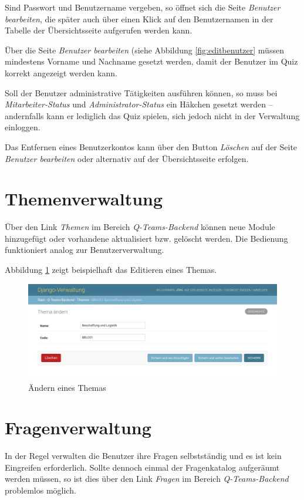 \documentclass[a4paper,11pt,listof=numbered,glossary=totoc,parskip=half,toc=bib]{scrreprt}
\begin{document}
\begin{appendices}
	Sind Passwort und Benutzername vergeben, so öffnet sich die Seite \textit{Benutzer bearbeiten}, die später auch über einen Klick auf den Benutzernamen in der Tabelle der Übersichtsseite aufgerufen werden kann.
	
	Über die Seite \textit{Benutzer bearbeiten} (siehe Abbildung \ref{fig:editbenutzer} müssen mindestens Vorname und Nachname gesetzt werden, damit der Benutzer im Quiz korrekt angezeigt werden kann.
	
	Soll der Benutzer administrative Tätigkeiten ausführen können, so muss bei \textit{Mitarbeiter-Status} und \textit{Administrator-Status} ein Häkchen gesetzt werden -- andernfalls kann er lediglich das Quiz spielen, sich jedoch nicht in der Verwaltung einloggen.
	
	Das Entfernen eines Benutzerkontos kann über den Button \textit{Löschen} auf der Seite \textit{Benutzer bearbeiten} oder alternativ auf der Übersichtsseite erfolgen.
	
	\section{Themenverwaltung}
	Über den Link \textit{Themen} im Bereich \textit{Q-Teams-Backend} können neue Module hinzugefügt oder vorhandene aktualisiert bzw. gelöscht werden. Die Bedienung funktioniert analog zur Benutzerverwaltung.
	
	Abbildung \ref{fig:editthema} zeigt beispielhaft das Editieren eines Themas.
	
	\begin{figure}
		\centering
		\includegraphics[width=\textwidth]{editthema}
		\caption{Ändern eines Themas}
		\label{fig:editthema}
	\end{figure}
	
	\section{Fragenverwaltung}
	In der Regel verwalten die Benutzer ihre Fragen selbstständig und es ist kein Eingreifen erforderlich. Sollte dennoch einmal der Fragenkatalog aufgeräumt werden müssen, so ist dies über den Link \textit{Fragen} im Bereich \textit{Q-Teams-Backend} problemlos möglich. 
	

\end{appendices}
\end{document}
